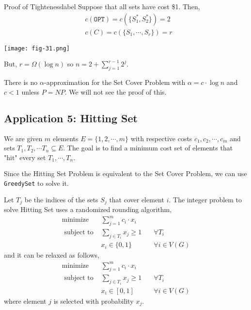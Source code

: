 \begin{ex}{Proof of Tighteness}{label}
	Suppose that all sets have cost \$1. Then,
	\begin{align*}
		&c(\texttt{OPT}) = c(\{S_1^*, S_2^*\}) = 2\\
		&c(C) = c(\{S_1, \cdots, S_r\}) =  r
	\end{align*}
	\begin{center}
		\texttt{[image: fig-31.png]}
	\end{center}
	\noindent But, $r = \Omega\left(\log n \right)$ so $n = 2 + \sum_{j=1}^{r-1} 2^j$.
\end{ex}

\begin{rmk}
	There is no $\alpha$-approximation for the Set Cover Problem with $\alpha = c \cdot \log n$ and $c < 1$ unless $P = NP$. We will not see the proof of this.
\end{rmk}

\subsection{Application 5: Hitting Set}
We are given $m$ elements $E = \{1, 2, \cdots, m\}$ with respective costs $c_1, c_2, \cdots, c_m$ and sets $T_1, T_2, \cdots T_n \subseteq E$. The goal is to find a minimum cost set of elements that "hit" every set $T_1, \cdots, T_n$.

\begin{rmk}
	Since the Hitting Set Problem is equivalent to the Set Cover Problem, we can use \texttt{GreedySet} to solve it.
\end{rmk}

\begin{defn}
	Let $T_j$ be the indices of the sets $S_j$ that cover element $i$. The integer problem to solve Hitting Set uses a randomized rounding algorithm,
		\[
		\begin{array}{lll}
			\operatorname{minimize} & \sum_{j=1}^m c_i \cdot x_i & \\
			\text{ subject to } & \sum_{j \in T_i} x_j \geq 1 & \quad \forall T_i\\
			& x_i \in\{0,1\} & \quad \forall i \in V(G)
		\end{array}
		\]
	\noindent and it can be relaxed as follows,
	\[
		\begin{array}{lll}
			\operatorname{minimize} & \sum_{j=1}^m c_i \cdot x_i & \\
			\text{ subject to } & \sum_{j \in T_i} x_j \geq 1 & \quad \forall T_i\\
			& x_i \in [0,1] & \quad \forall i \in V(G)
		\end{array}
	\]
	\noindent where element $j$ is selected with probability $x_j$.
\end{defn}

